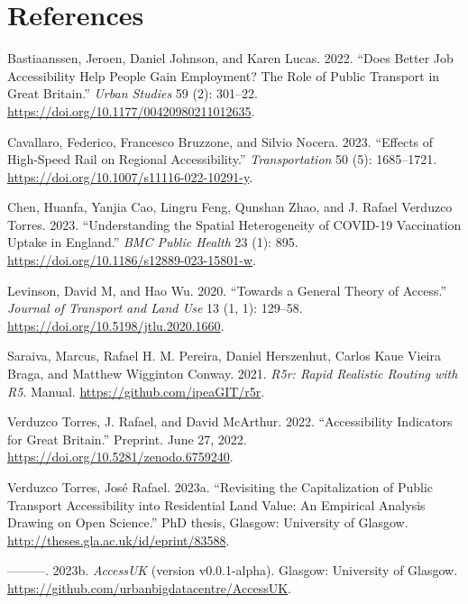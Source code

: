 \documentclass{article}
\newlength{\cslhangindent}
\newlength{\cslentryspacingunit} %
\newenvironment{CSLReferences}[2] %
 {%
  \setlength{\parindent}{0pt}
  \ifodd #1
  \let\oldpar\par
  \def\par{\hangindent=\cslhangindent\oldpar}
  \fi
  \setlength{\parskip}{#2\cslentryspacingunit}
 }%
 {}
\begin{document}
\hypertarget{references}{%
\section*{References}\label{references}}

\hypertarget{refs}{}
\begin{CSLReferences}{1}{0}
\leavevmode{}%
Bastiaanssen, Jeroen, Daniel Johnson, and Karen Lucas. 2022. {``Does
Better Job Accessibility Help People Gain Employment? {The} Role of
Public Transport in {Great Britain}.''} \emph{Urban Studies} 59 (2):
301--22. \url{https://doi.org/10.1177/00420980211012635}.

\leavevmode{}%
Cavallaro, Federico, Francesco Bruzzone, and Silvio Nocera. 2023.
{``Effects of High-Speed Rail on Regional Accessibility.''}
\emph{Transportation} 50 (5): 1685--1721.
\url{https://doi.org/10.1007/s11116-022-10291-y}.

\leavevmode{}%
Chen, Huanfa, Yanjia Cao, Lingru Feng, Qunshan Zhao, and J. Rafael
Verduzco Torres. 2023. {``Understanding the Spatial Heterogeneity of
{COVID-19} Vaccination Uptake in {England}.''} \emph{BMC Public Health}
23 (1): 895. \url{https://doi.org/10.1186/s12889-023-15801-w}.

\leavevmode{}%
Levinson, David M, and Hao Wu. 2020. {``Towards a General Theory of
Access.''} \emph{Journal of Transport and Land Use} 13 (1, 1): 129--58.
\url{https://doi.org/10.5198/jtlu.2020.1660}.

\leavevmode{}%
Saraiva, Marcus, Rafael H. M. Pereira, Daniel Herszenhut, Carlos Kaue
Vieira Braga, and Matthew Wigginton Conway. 2021. \emph{R5r: {Rapid}
Realistic Routing with {R5}}. Manual.
\url{https://github.com/ipeaGIT/r5r}.

\leavevmode{}%
Verduzco Torres, J. Rafael, and David McArthur. 2022. {``Accessibility
{Indicators} for {Great Britain}.''} Preprint. June 27, 2022.
\url{https://doi.org/10.5281/zenodo.6759240}.

\leavevmode{}%
Verduzco Torres, José Rafael. 2023a. {``Revisiting the Capitalization of
Public Transport Accessibility into Residential Land Value: An Empirical
Analysis Drawing on {Open Science}.''} PhD thesis, {Glasgow}:
{University of Glasgow}. \url{http://theses.gla.ac.uk/id/eprint/83588}.

\leavevmode{}%
---------. 2023b. \emph{{AccessUK}} (version v0.0.1-alpha). {Glasgow}:
{University of Glasgow}.
\url{https://github.com/urbanbigdatacentre/AccessUK}.

\end{CSLReferences}



\end{document}
